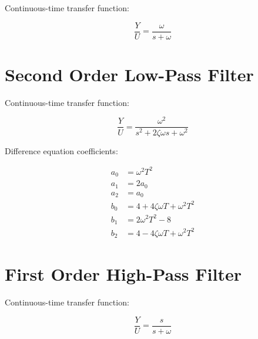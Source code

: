 \documentclass{article}
\begin{document}
Continuous-time transfer function:

\begin{equation}
\frac{Y}{U} = \frac{\omega}{s + \omega}
\end{equation}

\section{Second Order Low-Pass Filter}

Continuous-time transfer function:

\begin{equation}
\frac{Y}{U} = \frac{\omega^2}{s^2 + 2 \zeta \omega s + \omega^2}
\end{equation}

Difference equation coefficients:

\begin{align*}
a_0 &= \omega^2 T^2 \\
a_1 &= 2 a_0 \\
a_2 &= a_0 \\
b_0 &= 4 + 4 \zeta \omega T + \omega^2 T^2 \\
b_1 &= 2 \omega^2 T^2 - 8 \\
b_2 &= 4 - 4 \zeta \omega T + \omega^2 T^2
\end{align*}

\section{First Order High-Pass Filter}

Continuous-time transfer function:

\begin{equation}
\frac{Y}{U} = \frac{s}{s + \omega}
\end{equation}
\end{document}
